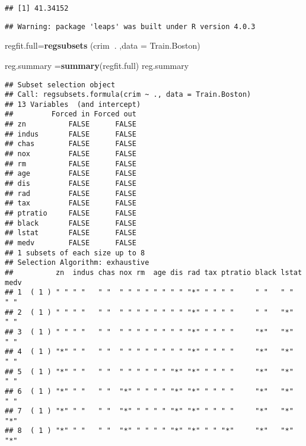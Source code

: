 \documentclass[
]{article}
\newenvironment{Shaded}{\begin{snugshade}}{\end{snugshade}}
\newcommand{\CommentTok}[1]{\textcolor[rgb]{0.56,0.35,0.01}{\textit{#1}}}
\newcommand{\DataTypeTok}[1]{\textcolor[rgb]{0.13,0.29,0.53}{#1}}
\newcommand{\KeywordTok}[1]{\textcolor[rgb]{0.13,0.29,0.53}{\textbf{#1}}}
\newcommand{\NormalTok}[1]{#1}
\newcommand{\OperatorTok}[1]{\textcolor[rgb]{0.81,0.36,0.00}{\textbf{#1}}}
\begin{document}
\begin{verbatim}
## [1] 41.34152
\end{verbatim}

\begin{Shaded}
\end{Shaded}

\begin{verbatim}
## Warning: package 'leaps' was built under R version 4.0.3
\end{verbatim}

\begin{Shaded}
\begin{Highlighting}[]
\NormalTok{regfit.full=}\KeywordTok{regsubsets}\NormalTok{ (crim}\OperatorTok{~}\NormalTok{. ,}\DataTypeTok{data =}\NormalTok{ Train.Boston)}

\NormalTok{reg.summary =}\KeywordTok{summary}\NormalTok{(regfit.full)}
\NormalTok{reg.summary}
\end{Highlighting}
\end{Shaded}

\begin{verbatim}
## Subset selection object
## Call: regsubsets.formula(crim ~ ., data = Train.Boston)
## 13 Variables  (and intercept)
##         Forced in Forced out
## zn          FALSE      FALSE
## indus       FALSE      FALSE
## chas        FALSE      FALSE
## nox         FALSE      FALSE
## rm          FALSE      FALSE
## age         FALSE      FALSE
## dis         FALSE      FALSE
## rad         FALSE      FALSE
## tax         FALSE      FALSE
## ptratio     FALSE      FALSE
## black       FALSE      FALSE
## lstat       FALSE      FALSE
## medv        FALSE      FALSE
## 1 subsets of each size up to 8
## Selection Algorithm: exhaustive
##          zn  indus chas nox rm  age dis rad tax ptratio black lstat medv
## 1  ( 1 ) " " " "   " "  " " " " " " " " "*" " " " "     " "   " "   " " 
## 2  ( 1 ) " " " "   " "  " " " " " " " " "*" " " " "     " "   "*"   " " 
## 3  ( 1 ) " " " "   " "  " " " " " " " " "*" " " " "     "*"   "*"   " " 
## 4  ( 1 ) "*" " "   " "  " " " " " " " " "*" " " " "     "*"   "*"   " " 
## 5  ( 1 ) "*" " "   " "  " " " " " " "*" "*" " " " "     "*"   "*"   " " 
## 6  ( 1 ) "*" " "   " "  "*" " " " " "*" "*" " " " "     "*"   "*"   " " 
## 7  ( 1 ) "*" " "   " "  "*" " " " " "*" "*" " " " "     "*"   "*"   "*" 
## 8  ( 1 ) "*" " "   " "  "*" " " " " "*" "*" " " "*"     "*"   "*"   "*"
\end{verbatim}
\end{document}
